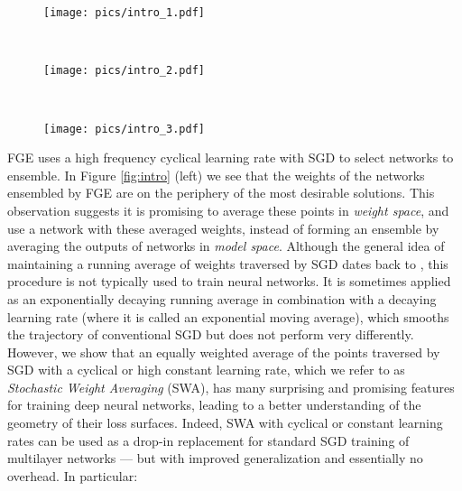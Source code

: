 \documentclass[letterpaper]{article}
\begin{document}
\begin{figure*}[!h]
	\centering
	\begin{subfigure}{0.27\textwidth}
		\texttt{[image: pics/intro\_1.pdf]}
	\end{subfigure}
	~~~~~~
	\begin{subfigure}{0.27\textwidth}
		\texttt{[image: pics/intro\_2.pdf]}
	\end{subfigure}
	~~~~~~
	\begin{subfigure}{0.27\textwidth}
		\texttt{[image: pics/intro\_3.pdf]}
	\end{subfigure}
  \caption{
    Illustrations of SWA and SGD with a Preactivation ResNet-$164$ on CIFAR-$100$\protect\footnotemark. 
    \textbf{Left}: test error surface for three
    FGE samples and the corresponding SWA solution (averaging in weight space). \textbf{Middle} and \textbf{Right}: 
    test error and train loss surfaces showing the weights proposed by SGD (at convergence)
    and SWA, starting from the same initialization of SGD after 125 training epochs.
	}
	\label{fig:intro}
\end{figure*}
  

FGE uses a high frequency cyclical learning rate with SGD to select networks to 
ensemble.  In Figure \ref{fig:intro} (left) we see that the weights of the networks 
ensembled by FGE are on the periphery of the most desirable solutions.
This observation suggests it is promising to  
average these points in \emph{weight space}, and use a network with 
these averaged weights, instead of forming an 
ensemble by averaging the outputs of networks in \emph{model space}.
Although the general idea of maintaining a running average of weights traversed by SGD dates back to \citet{ruppert1988}, 
this procedure is not typically used to train neural networks.  It is sometimes applied as an exponentially decaying running average in combination with a decaying learning rate (where it is called an exponential moving average), which smooths the trajectory of
conventional SGD but does not perform very differently. 
However, we show that an equally weighted average of the points traversed by SGD 
with a cyclical or high constant learning rate, which we refer to as \emph{Stochastic Weight Averaging} (SWA), has many surprising and
promising features for training deep neural networks, leading to a better understanding of the geometry of their loss surfaces.
Indeed, SWA with cyclical or constant learning rates can be used as a drop-in replacement for 
standard SGD training of multilayer networks --- but with improved generalization and essentially no overhead. In particular:
\end{document}
